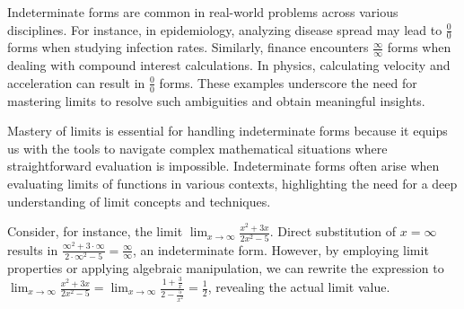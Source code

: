 Indeterminate forms are common in real-world problems across various disciplines. For instance, in epidemiology, analyzing disease spread may lead to \(\frac{0}{0}\) forms when studying infection rates. Similarly, finance encounters \(\frac{\infty}{\infty}\) forms when dealing with compound interest calculations. In physics, calculating velocity and acceleration can result in \(\frac{0}{0}\) forms. These examples underscore the need for mastering limits to resolve such ambiguities and obtain meaningful insights.


Mastery of limits is essential for handling indeterminate forms because it equips us with the tools to navigate complex mathematical situations where straightforward evaluation is impossible. Indeterminate forms often arise when evaluating limits of functions in various contexts, highlighting the need for a deep understanding of limit concepts and techniques.

Consider, for instance, the limit \( \lim_{x \to \infty} \frac{x^2 + 3x}{2x^2 - 5} \). Direct substitution of \( x = \infty \) results in \( \frac{\infty^2 + 3\cdot \infty}{2\cdot \infty^2 - 5} = \frac{\infty}{\infty} \), an indeterminate form. However, by employing limit properties or applying algebraic manipulation, we can rewrite the expression to \( \lim_{x \to \infty} \frac{x^2 + 3x}{2x^2 - 5} = \lim_{x \to \infty} \frac{1 + \frac{3}{x}}{2 - \frac{5}{x^2}} = \frac{1}{2} \), revealing the actual limit value.



